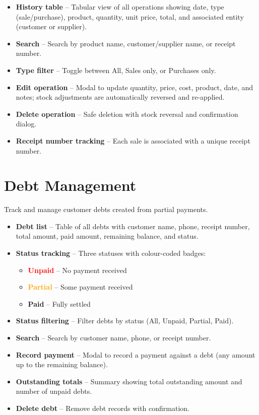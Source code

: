 \documentclass[12pt,a4paper]{article}
\begin{document}
\begin{itemize}[leftmargin=1.5em]
  \item \textbf{History table} -- Tabular view of all operations showing date,
        type (sale/purchase), product, quantity, unit price, total, and
        associated entity (customer or supplier).
  \item \textbf{Search} -- Search by product name, customer/supplier name, or
        receipt number.
  \item \textbf{Type filter} -- Toggle between All, Sales only, or Purchases
        only.
  \item \textbf{Edit operation} -- Modal to update quantity, price, cost,
        product, date, and notes; stock adjustments are automatically reversed
        and re-applied.
  \item \textbf{Delete operation} -- Safe deletion with stock reversal and
        confirmation dialog.
  \item \textbf{Receipt number tracking} -- Each sale is associated with a
        unique receipt number.
\end{itemize}

\section{Debt Management}

Track and manage customer debts created from partial payments.

\begin{itemize}[leftmargin=1.5em]
  \item \textbf{Debt list} -- Table of all debts with customer name, phone,
        receipt number, total amount, paid amount, remaining balance, and
        status.
  \item \textbf{Status tracking} -- Three statuses with colour-coded badges:
    \begin{itemize}
      \item \textcolor{red}{\textbf{Unpaid}} -- No payment received
      \item \textcolor{orange}{\textbf{Partial}} -- Some payment received
      \item \textcolor{green!60!black}{\textbf{Paid}} -- Fully settled
    \end{itemize}
  \item \textbf{Status filtering} -- Filter debts by status (All, Unpaid,
        Partial, Paid).
  \item \textbf{Search} -- Search by customer name, phone, or receipt number.
  \item \textbf{Record payment} -- Modal to record a payment against a debt
        (any amount up to the remaining balance).
  \item \textbf{Outstanding totals} -- Summary showing total outstanding
        amount and number of unpaid debts.
  \item \textbf{Delete debt} -- Remove debt records with confirmation.
\end{itemize}
\end{document}
